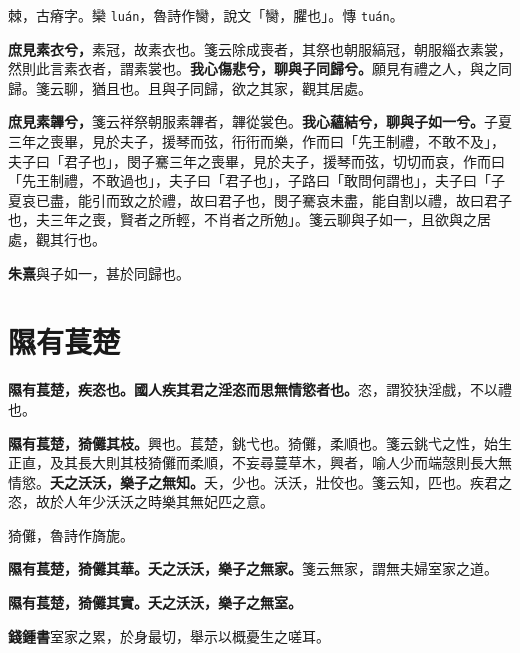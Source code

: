 \begin{quoting}棘，古瘠字。欒 \texttt{luán}，魯詩作臠，說文「臠，臞也」。慱 \texttt{tuán}。\end{quoting}

\textbf{庶見素衣兮，}{\footnotesize 素冠，故素衣也。箋云除成喪者，其祭也朝服縞冠，朝服緇衣素裳，然則此言素衣者，謂素裳也。}\textbf{我心傷悲兮，聊與子同歸兮。}{\footnotesize 願見有禮之人，與之同歸。箋云聊，猶且也。且與子同歸，欲之其家，觀其居處。}

\textbf{庶見素韠兮，}{\footnotesize 箋云祥祭朝服素韠者，韠從裳色。}\textbf{我心蘊結兮，聊與子如一兮。}{\footnotesize 子夏三年之喪畢，見於夫子，援琴而弦，衎衎而樂，作而曰「先王制禮，不敢不及」，夫子曰「君子也」，閔子騫三年之喪畢，見於夫子，援琴而弦，切切而哀，作而曰「先王制禮，不敢過也」，夫子曰「君子也」，子路曰「敢問何謂也」，夫子曰「子夏哀已盡，能引而致之於禮，故曰君子也，閔子騫哀未盡，能自割以禮，故曰君子也，夫三年之喪，賢者之所輕，不肖者之所勉」。箋云聊與子如一，且欲與之居處，觀其行也。}

\begin{quoting}\textbf{朱熹}與子如一，甚於同歸也。\end{quoting}

\section{隰有萇楚}


\textbf{隰有萇楚，疾恣也。國人疾其君之淫恣而思無情慾者也。}{\footnotesize 恣，謂狡㹟淫戲，不以禮也。}

\textbf{隰有萇楚，猗儺其枝。}{\footnotesize 興也。萇楚，銚弋也。猗儺，柔順也。箋云銚弋之性，始生正直，及其長大則其枝猗儺而柔順，不妄尋蔓草木，興者，喻人少而端愨則長大無情慾。}\textbf{夭之沃沃，樂子之無知。}{\footnotesize 夭，少也。沃沃，壯佼也。箋云知，匹也。疾君之恣，故於人年少沃沃之時樂其無妃匹之意。}

\begin{quoting}猗儺，魯詩作旖旎。\end{quoting}

\textbf{隰有萇楚，猗儺其華。夭之沃沃，樂子之無家。}{\footnotesize 箋云無家，謂無夫婦室家之道。}

\textbf{隰有萇楚，猗儺其實。夭之沃沃，樂子之無室。}

\begin{quoting}\textbf{錢鍾書}室家之累，於身最切，舉示以概憂生之嗟耳。\end{quoting}

